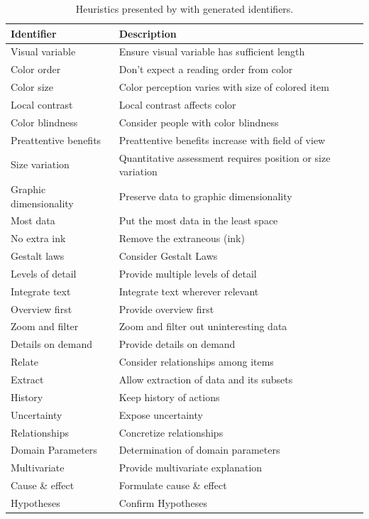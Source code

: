 \begin{table}
\begin{tabular}{|p{4.2cm}|p{8.8cm}|}
\hline
\textbf{Identifier} & \textbf{Description} \\ 
\hline
Visual variable & Ensure visual variable has sufficient length \\
Color order & Don't expect a reading order from color \\
Color size & Color perception varies with size of colored item \\
Local contrast & Local contrast affects color \\
Color blindness & Consider people with color blindness \\
Preattentive benefits & Preattentive benefits increase with field of view \\
Size variation & Quantitative assessment requires position or size variation \\
Graphic dimensionality & Preserve data to graphic dimensionality \\
Most data & Put the most data in the least space \\
No extra ink & Remove the extraneous (ink) \\
Gestalt laws & Consider Gestalt Laws \\
Levels of detail & Provide multiple levels of detail \\
Integrate text & Integrate text wherever relevant \\
Overview first & Provide overview first \\
Zoom and filter & Zoom and filter out uninteresting data \\
Details on demand & Provide details on demand \\
Relate &  Consider relationships among items \\
Extract & Allow extraction of data and its subsets \\
History & Keep history of actions \\
Uncertainty & Expose uncertainty \\
Relationships & Concretize relationships \\
Domain Parameters & Determination of domain parameters \\
Multivariate & Provide multivariate explanation \\
Cause \& effect & Formulate cause \& effect \\
Hypotheses & Confirm Hypotheses \\
\hline
\end{tabular}
\caption{Heuristics presented by \citet{zuk_heuristics_2006} with generated identifiers.}
\label{table:heuristics}
\end{table}

